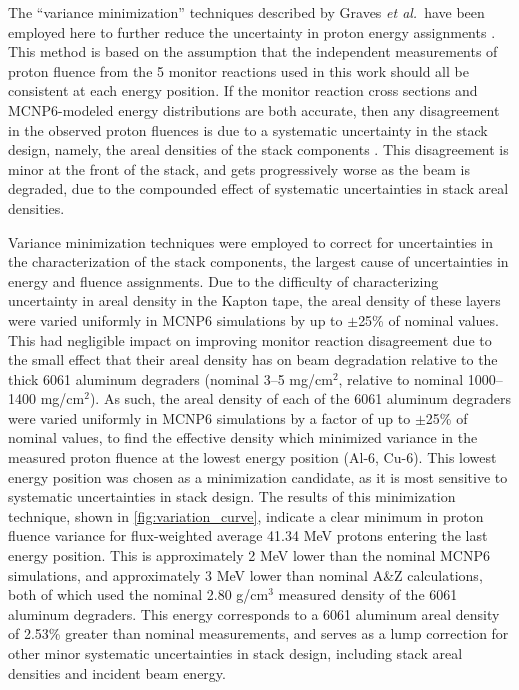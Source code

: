 \documentclass[%
 reprint,
superscriptaddress,
onecolumn,
linenumbers,
notitlepage,
 amsmath,amssymb,
 aps,
prc,
]{revtex4-1}
\newcommand{\etal}{\emph{et al.}}
\begin{document}
The \enquote{variance minimization} techniques  described by  Graves \etal\  have been employed here to further reduce the uncertainty in proton energy assignments     \cite{Graves2016}.
This method is based on the assumption that the independent measurements of proton fluence from the 5 monitor reactions used in this work should all be consistent at each energy position.
If the monitor reaction cross sections and MCNP6-modeled energy distributions are both accurate, then any disagreement in the  observed proton fluences is due to a systematic uncertainty in the stack design, namely, the areal densities of the stack components \cite{Graves2016,Marus2015}. 
This disagreement is minor at the front of the stack, and gets progressively worse as the beam is degraded, due to the compounded effect of systematic uncertainties in stack areal densities.



Variance minimization techniques were employed  to correct for uncertainties in  the characterization of the stack components, the largest cause of uncertainties in energy and  fluence assignments.
Due to the difficulty of characterizing uncertainty in areal density in the Kapton tape, the areal density of these layers were varied uniformly in MCNP6 simulations by up to $\pm$25\% of nominal values.
This had negligible impact on improving monitor reaction disagreement  due to the small effect that their areal density has on beam degradation relative to the thick 6061 aluminum degraders (nominal 3--5 mg/cm$^2$, relative to nominal 1000--1400 mg/cm$^2$).
As such,  the areal density of each of the 6061 aluminum degraders  were varied uniformly in MCNP6 simulations  by a factor of up to $\pm$25\% of nominal values, to find the effective density which minimized variance in the measured proton fluence at the lowest energy position (Al-6, Cu-6).
This lowest energy position was chosen as a minimization candidate, as it is most sensitive to systematic uncertainties in stack design.
The results of this minimization technique, shown in \autoref{fig:variation_curve}, indicate a clear minimum in proton fluence variance for flux-weighted average 41.34 MeV protons entering the last energy position.
This is approximately 2 MeV lower than the nominal MCNP6 simulations, and approximately 3 MeV lower than nominal A\&Z calculations, both of which used the nominal 2.80 g/cm$^3$ measured density of the 6061 aluminum degraders.
This energy corresponds to a 6061 aluminum areal density of 2.53\% greater than nominal measurements, and serves as a lump correction for other minor systematic uncertainties in stack design, including stack areal densities and incident beam energy.
\end{document}

